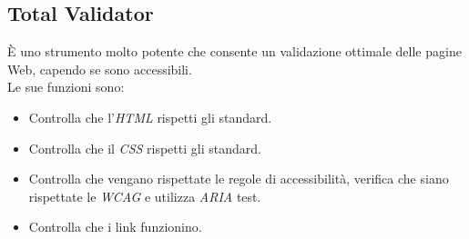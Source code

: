 \subsection{Total Validator}
È uno strumento molto potente che consente un validazione ottimale delle pagine Web, capendo se sono accessibili.\\
Le sue funzioni sono:
\begin{itemize}
	\item Controlla che l'\emph{HTML} rispetti gli standard.
	\item Controlla che il \emph{CSS} rispetti gli standard.
	\item Controlla che vengano rispettate le regole di accessibilità, verifica che siano rispettate le \emph{WCAG} e utilizza \emph{ARIA} test.
	\item Controlla che i link funzionino.
\end{itemize}